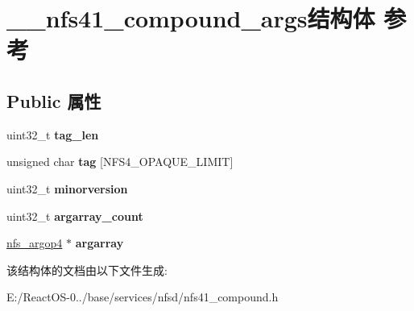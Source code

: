 \hypertarget{struct____nfs41__compound__args}{}\section{\+\_\+\+\_\+nfs41\+\_\+compound\+\_\+args结构体 参考}
\label{struct____nfs41__compound__args}
\subsection*{Public 属性}
\begin{DoxyCompactItemize}
\item 
\mbox{\label{struct____nfs41__compound__args_a0a4c3b1e5cfe3a14d7556ada5df6b7eb}} 
uint32\+\_\+t {\bfseries tag\+\_\+len}
\item 
\mbox{\label{struct____nfs41__compound__args_a4294661d6923b2fd026445cbb48af519}} 
unsigned char {\bfseries tag} \mbox{[}N\+F\+S4\+\_\+\+O\+P\+A\+Q\+U\+E\+\_\+\+L\+I\+M\+IT\mbox{]}
\item 
\mbox{\label{struct____nfs41__compound__args_a4b969279749513b44b797e81923e5ce8}} 
uint32\+\_\+t {\bfseries minorversion}
\item 
\mbox{\label{struct____nfs41__compound__args_a484bb90fba6e5433dc3484474c1765ed}} 
uint32\+\_\+t {\bfseries argarray\+\_\+count}
\item 
\mbox{\label{struct____nfs41__compound__args_abe7670a7ead7632d73fb476255236345}} 
\hyperlink{struct____nfs__argop4}{nfs\+\_\+argop4} $\ast$ {\bfseries argarray}
\end{DoxyCompactItemize}


该结构体的文档由以下文件生成\+:\begin{DoxyCompactItemize}
\item 
E\+:/\+React\+O\+S-\/0../base/services/nfsd/nfs41\+\_\+compound.\+h\end{DoxyCompactItemize}
